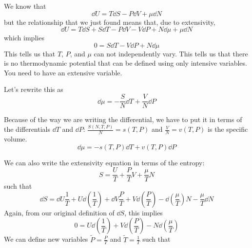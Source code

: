 \documentclass[a4paper,twoside,master.tex]{subfiles}
\begin{document}
We know that
\begin{equation}
    \dd{U} = T \dd{S} - P \dd{V} + \mu \dd{N}
\end{equation}
but the relationship that we just found means that, due to extensivity,
\begin{equation}
    \dd{U} = T \dd{S} + S \dd{T} - P \dd{V} - V \dd{P} + N \dd{\mu} + \mu \dd{N}
\end{equation}
which implies
\begin{equation}\label{eq:gibbs_duhem}
    0 = S \dd{T} - V \dd{P} + N \dd{\mu}\tag{Gibbs-Duhem Relation}
\end{equation}
This tells us that $ T $, $ P $, and $ \mu $ can not independently vary. This tells us that there is no thermodynamic potential that can be defined using only intensive variables. You need to have an extensive variable.

Let's rewrite this as
\begin{equation}
    \dd{\mu} = - \frac{S}{N} \dd{T} + \frac{V}{N} \dd{P}
\end{equation}

Because of the way we are writing the differential, we have to put it in terms of the differentials $ \dd{T} $ and $ \dd{P} $: $ \frac{S(N,T,P)}{N} = s(T,P) $ and $ \frac{V}{N} = v(T,P) $ is the specific volume.
\begin{equation}
    \dd{\mu} = -s(T,P) \dd{T} + v(T,P) \dd{P}
\end{equation}

We can also write the extensivity equation in terms of the entropy:
\begin{equation}
    S = \frac{U}{T} + \frac{P}{T} V + \frac{\mu}{T} N
\end{equation}
such that
\begin{equation}
    \dd{S} = \dd{U} \frac{1}{T} + U \dd{\left( \frac{1}{T} \right)} + \dd{V} \frac{P}{T} + V \dd{\left( \frac{P}{T} \right)} - \dd{\left( \frac{\mu}{T} \right)} N - \frac{\mu}{T} \dd{N}
\end{equation}
Again, from our original definition of $ \dd{S} $, this implies
\begin{equation}
    0 = U \dd{\left( \frac{1}{T} \right)} + V \dd{\left( \frac{P}{T} \right)} - N \dd{\left( \frac{\mu}{T}\right)}
\end{equation}
We can define new variables $ \tilde{P} = \frac{P}{T} $ and $ \tilde{T} = \frac{1}{T} $ such that
\end{document}
